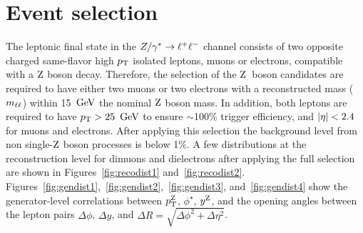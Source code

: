 \section{Event selection}
The leptonic final state in the $Z/\gamma^*\to\ell^+\ell^-$ channel consists of two opposite 
charged same-flavor high $p_{\mathrm{T}}$ isolated leptons, muons or electrons, 
compatible with a $\mathrm{Z}$ boson decay. Therefore, the selection of the 
$\mathrm{Z}$~boson candidates are required to have either two muons or two electrons 
with a reconstructed mass ($m_{\ell\ell}$) within 15 $\,\text{Ge\hspace{-.08em}V}$ the nominal $\mathrm{Z}$ boson mass. In addition, 
both leptons are required to have $p_{\mathrm{T}}>25~\,\text{Ge\hspace{-.08em}V}$ to ensure $\sim$100\% trigger 
efficiency, and $\lvert \eta \rvert<2.4$ for muons and electrons. 
After applying this selection the background level from non single-$\mathrm{Z}$ boson 
processes is below 1\%. A few distributions at the reconstruction level 
for dimuons and dielectrons after applying the full selection are 
shown in Figures~\ref{fig:recodist1} and~\ref{fig:recodist2}. 
Figures~\ref{fig:gendist1},~\ref{fig:gendist2},~\ref{fig:gendist3}, and~\ref{fig:gendist4} show the generator-level
correlations between $p_{\mathrm{T}}^{\mathrm{Z}}$, $\phi^\star$, $y^{\mathrm{Z}}$, and the opening angles between the lepton pairs $\Delta\phi$, $\Delta y$, and 
$\Delta R = \sqrt{ \Delta\phi^{2} + \Delta\eta^{2} }$.

